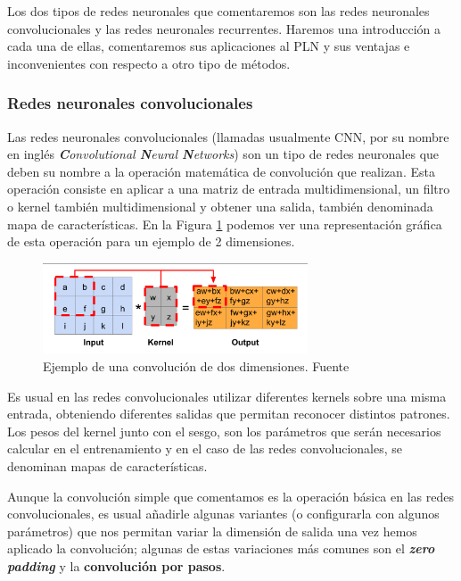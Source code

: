 Los dos tipos de redes neuronales que comentaremos son las redes neuronales convolucionales y las redes neuronales recurrentes. Haremos una introducción a cada una de ellas, comentaremos sus aplicaciones al PLN y sus ventajas e inconvenientes con respecto a otro tipo de métodos. 


\subsubsection{Redes neuronales convolucionales}
\label{section:arte:arqu:cnn}

Las redes neuronales convolucionales (llamadas usualmente CNN, por su nombre en inglés \textit{\textbf{C}onvolutional \textbf{N}eural \textbf{N}etworks}) son un tipo de redes neuronales que deben su nombre a la operación matemática de convolución que realizan. Esta operación consiste en aplicar a una matriz de entrada multidimensional, un filtro o kernel también multidimensional y obtener una salida, también denominada mapa de características. En la Figura \ref{fig:cnn1} podemos ver una representación gráfica de esta operación para un ejemplo de 2 dimensiones. 

\begin{figure}[!ht]
	\centering
	\includegraphics[width=0.7\textwidth]{images/arte/cnn1}
	\caption{Ejemplo de una convolución de dos dimensiones. Fuente \cite{temariodeeplearning}}
	\label{fig:cnn1}
\end{figure}

Es usual en las redes convolucionales  utilizar diferentes kernels sobre una misma entrada, obteniendo diferentes salidas que permitan reconocer distintos patrones. Los pesos del kernel junto con el sesgo, son los parámetros que serán necesarios calcular en el entrenamiento y en el caso de las redes convolucionales, se denominan mapas de características.

Aunque la convolución simple que comentamos es la operación básica en las redes convolucionales, es usual añadirle algunas variantes (o configurarla con algunos parámetros) que nos permitan variar la dimensión de salida una vez hemos aplicado la convolución; algunas de estas variaciones más comunes son el \textbf{\textit{zero padding}} y la \textbf{convolución por pasos}.


